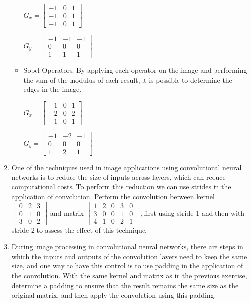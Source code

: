 \begin{enumerate}
\begin{itemize}
$G_x= \left[\begin{smallmatrix}
-1 & 0 & 1\\
-1 & 0 & 1\\
-1 & 0 & 1
\end{smallmatrix}\right]$

$G_y = \left[\begin{smallmatrix}
-1 & -1 & -1\\
 0 &  0 &  0\\
 1 &  1 &  1
\end{smallmatrix}\right]$

\item Sobel Operators. By applying each operator on the image and performing the sum of the modulus of each result, it is possible to determine the edges in the image.

$G_x= \left[\begin{smallmatrix}
-1 & 0 & 1\\
-2 & 0 & 2\\
-1 & 0 & 1
\end{smallmatrix}\right]$

$G_y = \left[\begin{smallmatrix}
-1 & -2 & -1\\
 0 &  0 &  0\\
 1 &  2 &  1
\end{smallmatrix}\right]$

\end{itemize}

\item \noindent One of the techniques used in image applications using convolutional neural networks is to reduce the size of inputs across layers, which can reduce computational costs. To perform this reduction we can use strides in the application of convolution. Perform the convolution between kernel $\left[\begin{smallmatrix}
0 & 2 & 3 \\
0 & 1 & 0 \\
3 & 0 & 2 
\end{smallmatrix}\right]$ and matrix  $\left[\begin{smallmatrix}
1 & 2 & 0 & 3 & 0\\
3 & 0 & 0 & 1 & 0\\
4 & 1 & 0 & 2 & 1
\end{smallmatrix}\right]$, first using stride 1 and then with stride 2 to assess the effect of this technique. 


\item \noindent During image processing in convolutional neural networks, there are steps in which the inputs and outputs of the convolution layers need to keep the same size, and one way to have this control is to use padding in the application of the convolution. With the same kernel and matrix as in the previous exercise, determine a padding to ensure that the result remains the same size as the original matrix, and then apply the convolution using this padding.



\end{enumerate}

